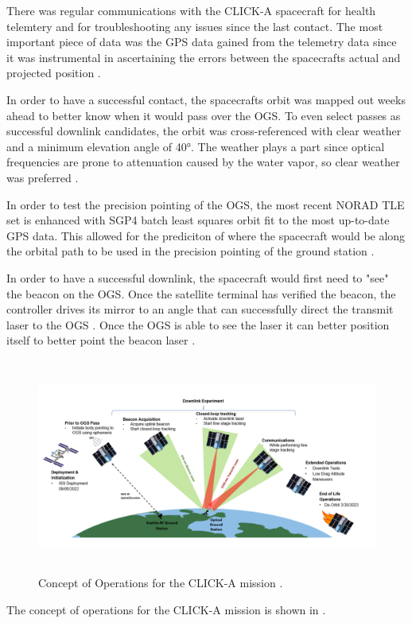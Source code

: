 There was regular communications with the CLICK-A spacecraft for health telemtery and for troubleshooting any issues since the last contact.
The most important piece of data was the GPS data gained from the telemetry data since it was instrumental in ascertaining the errors between the spacecrafts actual and projected position \cite{click_a}. 

In order to have a successful contact, the spacecrafts orbit was mapped out weeks ahead to better know when it would pass over the OGS.
To even select passes as successful downlink candidates, the orbit was cross-referenced with clear weather and a minimum elevation angle of \ang{40}.
The weather plays a part since optical frequencies are prone to attenuation caused by the water vapor, so clear weather was preferred \cite{click_a}. 

In order to test the precision pointing of the OGS, the most recent NORAD TLE set is enhanced with SGP4 batch least squares orbit fit to the most up-to-date GPS data. 
This allowed for the prediciton of where the spacecraft would be along the orbital path to be used in the precision pointing of the ground station \cite{click_a}.

In order to have a successful downlink, the spacecraft would first need to "see" the beacon on the OGS. Once the satellite terminal has verified the beacon, the controller drives its mirror to an angle that can successfully direct the transmit laser to the OGS \cite{click_a}. Once the OGS is able to see the laser it can better position itself to better point the beacon laser \cite{click_a}.

\begin{figure}[t]
    \centering
    \includegraphics[width=\textwidth, height=200pt]{images/click_a_downlink.PNG}
    \caption{Concept of Operations for the CLICK-A mission \cite{click_a}.}
    \label{fig:conops}
\end{figure}

The concept of operations for the CLICK-A mission is shown in .



